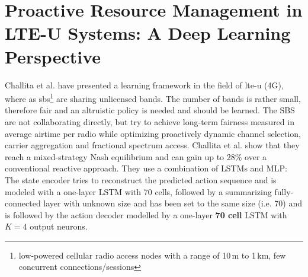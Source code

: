 \section{Proactive Resource Management in LTE-U Systems: A Deep Learning Perspective \cite{Challita2017}}
Challita et al. have presented a learning framework in the field of \gls{lte-u} (4G), where as \gls{sbs}\footnote{low-powered cellular radio access nodes with a range of 10\,m to 1\,km, few concurrent connections/sessions} are sharing unlicensed bands. The number of bands is rather small, therefore fair and an altruistic policy is needed and should be learned. The SBS are not collaborating directly, but try to achieve long-term fairness measured in average airtime per radio while optimizing proactively dynamic channel selection, carrier aggregation and fractional spectrum access. Challita et al. show that they reach a mixed-strategy Nash equilibrium and can gain up to 28\% over a conventional reactive approach. They use a combination of LSTMs and MLP: The state encoder tries to reconstruct the predicted action sequence and is modeled with a one-layer LSTM with 70 cells, followed by a summarizing fully-connected layer with unknown size and has been set to the same size (i.e. 70) and is followed by the action decoder modelled by a one-layer \textbf{70 cell} LSTM with $K=4$ output neurons. 



